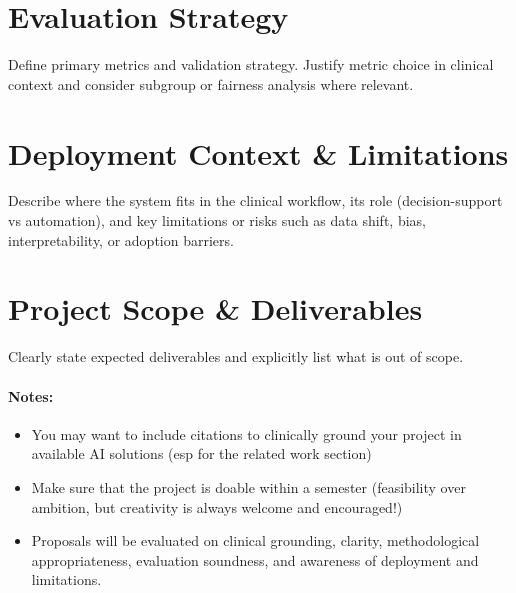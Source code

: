 \documentclass{article}
\begin{document}
\section{Evaluation Strategy}
Define primary metrics and validation strategy. Justify metric choice in clinical context and consider
subgroup or fairness analysis where relevant.

\section{Deployment Context \& Limitations}
Describe where the system fits in the clinical workflow, its role (decision-support vs automation), and
key limitations or risks such as data shift, bias, interpretability, or adoption barriers.

\section{Project Scope \& Deliverables}
Clearly state expected deliverables and explicitly list what is out of scope.


\paragraph{\textbf{Notes}:}
\begin{itemize}
    \item You may want to include citations to clinically ground your project in available AI solutions (esp for the related work section)
    \item Make sure that the project is doable within a semester (feasibility over ambition, but creativity is always welcome and encouraged!)
    \item Proposals will be evaluated on clinical grounding, clarity, methodological appropriateness, evaluation soundness, and awareness of deployment and limitations.
\end{itemize}
\end{document}
